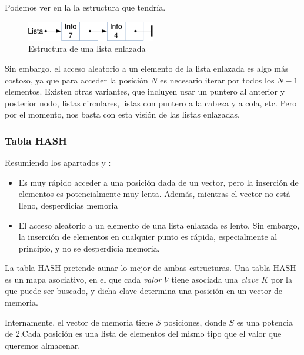 Podemos ver en la  la estructura que tendría.

\begin{figure}[htbp]
\centering
\includegraphics[width=0.5\textwidth]{CapituloEstructura/Figuras/EstructuraListaEnlazada-crop}
\caption{Estructura de una lista enlazada}
\end{figure}
%

Sin embargo, el acceso aleatorio a un elemento de la lista enlazada es algo más costoso, ya que para acceder la 
posición $N$ es necesario iterar por todos los $N-1$ elementos. Existen otras variantes, que incluyen usar un puntero 
al anterior y posterior nodo, listas circulares, listas con puntero a la cabeza y a cola, etc. Pero por el momento, nos 
basta con esta visión de las listas enlazadas.

\subsubsection{Tabla HASH}
Resumiendo los apartados  y :
\begin{itemize}
 \item Es muy rápido acceder a una posición dada de un vector, pero la inserción de elementos es potencialmente muy 
lenta. Además, mientras el vector no está lleno, desperdicias memoria
 \item El acceso aleatorio a un elemento de una lista enlazada es lento. Sin embargo, la inserción de elementos en 
cualquier punto es rápida, especialmente al principio, y no se desperdicia memoria.
\end{itemize}

La tabla HASH pretende aunar lo mejor de ambas estructuras. Una tabla HASH es un mapa asociativo, en el que cada 
\emph{valor} $V$ tiene asociada una \emph{clave} $K$ por la que puede ser buscado, y dicha clave determina una posición 
en un vector de memoria.

Internamente, el vector de memoria tiene $S$ posiciones, donde $S$ es una potencia de 2.Cada posición es una lista de 
elementos del mismo tipo que el valor que queremos almacenar.

